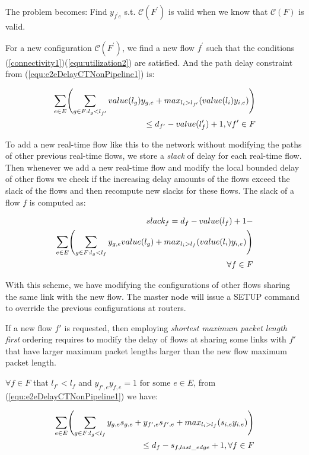 \documentclass[conference, twocolumn]{IEEEtran}
\theoremstyle{definition}
\begin{document}
The problem becomes: Find $y_{f^{'}e}$ s.t. ${\mathcal C}(F^{'})$ is valid
when we know that ${\mathcal C}(F)$ is valid.

For a new configuration ${\mathcal C}(F^{'})$, we find a new flow $f^{'}$ such
that the conditions (\ref{connectivity1})(\ref{equ:utilization2}) are satisfied. And
the path delay constraint from (\ref{equ:e2eDelayCTNonPipeline1}) is:

\begin{eqnarray}\label{equ:e2eDelayNewPath1}
\sum_{e \in E} \Biggl(\sum_{g \in F:l_g <
l_{f'}}value(l_g)y_{g,e} +max_{l_i>l_{f'}}(value(l_i)y_{i,e})\Biggr)\notag \\
\leq d_{f'}-value(l_f') + 1, \forall f' \in F
\end{eqnarray}

To add a new real-time flow like this to the network without modifying the paths
of other previous real-time flows, we store a {\em slack} of delay for each
real-time flow. Then whenever we add a new real-time flow and modify the local
bounded delay of other flows we check if the increasing delay amounts of the
flows exceed the slack of the flows and then recompute new slacks for these
flows. The slack of a flow $f$ is computed as:

\begin{eqnarray}\label{equ:slack1}
	slack_f= d_f-value(l_f) + 1 - \notag \\
	\sum_{e \in E} \Biggl(\sum_{g \in F:l_g < l_f}y_{g,e}value(l_g)
	+max_{l_i>l_f}(value(l_i)y_{i,e})\Biggr) \notag \\ 
	\forall f \in F
\end{eqnarray}

With this scheme, we have modifying the configurations of other flows sharing
the same link with the new flow. The master node will issue a SETUP command to
override the previous configurations at routers.

If a new flow $f'$ is requested, then employing {\em shortest maximum packet
length first} ordering requires to modify the delay of flows at sharing some
links with $f'$ that have larger maximum packet lengths larger than the new flow
maximum packet length. 

$\forall f \in F$  that $l_{f'} < l_f$ and $y_{f',e}y_{f,e}=1 \mbox{ for some }
e \in E$, from (\ref{equ:e2eDelayCTNonPipeline1}) we have:

\begin{eqnarray}\label{equ:e2eDelayModification}
\sum_{e \in E} \Biggl(\sum_{g \in F:l_g <
l_f}y_{g,e}s_{g,e}+y_{f',e}s_{f',e}+max_{l_i>l_f}(s_{i,e}y_{i,e})\Biggr)\notag
\\ \leq d_f-s_{f, last\_edge} + 1, \forall f \in F
\end{eqnarray}
\end{document}
